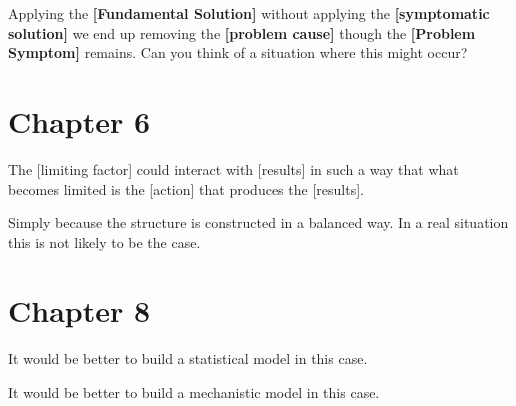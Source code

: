 \documentclass[]{memoir}
\newcommand{\p}[1]{\textbf{{[}#1{]}}}
\begin{document}

Applying the \p{Fundamental Solution} without applying the
\p{symptomatic solution} we end up removing the \p{problem cause} though
the \p{Problem Symptom} remains. Can you think of a situation where this
might occur?

\section{Chapter 6}


The {[}limiting factor{]} could interact with {[}results{]} in such a
way that what becomes limited is the {[}action{]} that produces the
{[}results{]}.


Simply because the structure is constructed in a balanced way. In a real
situation this is not likely to be the case.

\section{Chapter 8}


It would be better to build a statistical model in this case.


It would be better to build a mechanistic model in this case.
\end{document}
